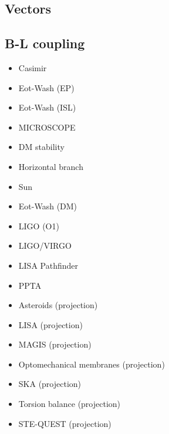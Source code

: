 \documentclass[8pt,twocolumn]{extarticle}
\begin{document}
\begin{mdframed}
\vspace{-1em}
\section{Vectors}\vspace{-0.5em}

\subsection*{B-L coupling}\vspace{-0.5em}
\begin{itemize}\setlength\itemsep{-0.5em}
	\item Casimir~\cite{Bordag:2001qi,Decca:2005qz,Sushkov:2011md}
	\item Eot-Wash (EP)~\cite{Wagner:2012ui}
	\item Eot-Wash (ISL)~\cite{Adelberger:2009zz}
	\item MICROSCOPE~\cite{MICROSCOPE:2022doy}
	\item DM stability~\cite{Chun:2022qcg}
	\item Horizontal branch~\cite{Hardy:2016kme}
	\item Sun~\cite{Hardy:2016kme}
	\item Eot-Wash (DM)~\cite{Shaw:2021gnp}
	\item LIGO (O1)~\cite{LIGOScientific:2021ffg}
	\item LIGO/VIRGO~\cite{LIGOScientific:2021ffg}
	\item LISA Pathfinder~\cite{Miller:2023kkd}
	\item PPTA~\cite{PPTA:2021uzb}
	\item Asteroids (projection)~\cite{Fedderke:2022ptm}
	\item LISA (projection)~\cite{Fedderke:2022ptm}
	\item MAGIS (projection)~\cite{MAGIS}
	\item Optomechanical membranes (projection)~\cite{Manley:2020mjq}
	\item SKA (projection)~\cite{Graham:2015ifn}
	\item Torsion balance (projection)~\cite{Graham:2015ifn}
	\item STE-QUEST (projection)~\cite{Ahlers:2022jdt}
\end{itemize}
\end{mdframed}

\newpage
\end{document}
